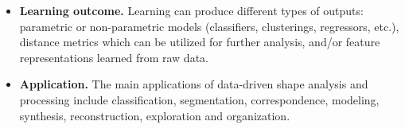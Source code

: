 {\begin{itemize}
                                supervised, semi-supervised and unsupervised methods.
  \item \textbf{Learning outcome.} Learning can produce different types of outputs:
parametric or non-parametric models (classifiers, clusterings, regressors, etc.),
                                   distance metrics which can be utilized for further analysis, and/or feature representations learned from raw data.
  \item \textbf{Application.} The main applications of data-driven shape analysis and processing include classification, segmentation, correspondence,
                              modeling, synthesis, reconstruction, exploration and organization.
\end{itemize}}









